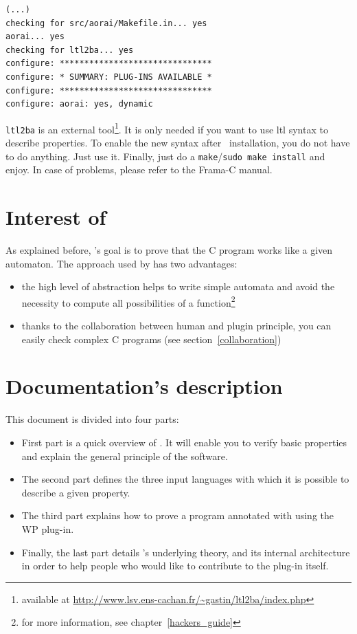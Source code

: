 \documentclass{report}
\begin{document}
\begin{verbatim}
(...)
checking for src/aorai/Makefile.in... yes
aorai... yes
checking for ltl2ba... yes
configure: *******************************
configure: * SUMMARY: PLUG-INS AVAILABLE *
configure: *******************************
configure: aorai: yes, dynamic
\end{verbatim}

\texttt{ltl2ba} is an external tool\footnote{available at
\url{http://www.lsv.ens-cachan.fr/~gastin/ltl2ba/index.php}}.
It is only needed if you want to use ltl syntax to describe properties. To
enable the new syntax after \aorai\ installation, you do not have to do
anything. Just use it. Finally, just do a 
\texttt{make}/\texttt{sudo make install} and enjoy.
In case of problems, please refer to the Frama-C manual.

\section{Interest of \aorai }

As explained before, \aorai 's goal is to prove that the C program
works like a given automaton. The approach used by \aorai has two
advantages:
\begin{itemize}
\item the high level of abstraction helps to write simple automata and
  avoid the necessity to compute all possibilities of a
  function\footnote{for more information, see
    chapter~\ref{hackers_guide}}
\item thanks to the collaboration between human and plugin principle,
  you can easily check complex C programs (see
  section~\ref{collaboration})
\end{itemize}

\section{Documentation's description}

This document is divided into four parts:
\begin{itemize}
\item First part is a quick overview of \aorai. It will enable you to
  verify basic properties and explain the general principle of the
  software.
\item The second part defines the three \aorai input languages with which it is
possible to describe a given property.
\item The third part explains how to prove a program annotated with \aorai 
using the WP plug-in.
\item Finally, the last part details \aorai 's underlying theory, and its
internal architecture in order to help people who would like to contribute to
the plug-in itself.
\end{itemize}
\end{document}
